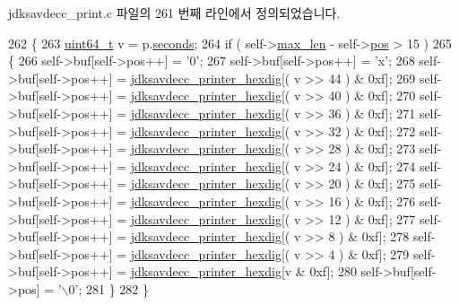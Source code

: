 jdksavdecc\+\_\+print.\+c 파일의 261 번째 라인에서 정의되었습니다.


\begin{DoxyCode}
262 \{
263     \hyperlink{parse_8c_aec6fcb673ff035718c238c8c9d544c47}{uint64\_t} v = p.\hyperlink{structjdksavdecc__gptp__seconds_aae1213f8226839b7226bcbfb6f1e568d}{seconds};
264     \textcolor{keywordflow}{if} ( self->\hyperlink{structjdksavdecc__printer_a956cb5a3c4322e6d67c2f2b21077716c}{max\_len} - self->\hyperlink{structjdksavdecc__printer_a5438a597ee291f523ae04a9fe355924f}{pos} > 15 )
265     \{
266         \textcolor{keyword}{self}->buf[\textcolor{keyword}{self}->pos++] = \textcolor{charliteral}{'0'};
267         \textcolor{keyword}{self}->buf[\textcolor{keyword}{self}->pos++] = \textcolor{charliteral}{'x'};
268         \textcolor{keyword}{self}->buf[\textcolor{keyword}{self}->pos++] = \hyperlink{jdksavdecc__print_8c_ad23c15dfac839a83ff16748e1737ba80}{jdksavdecc\_printer\_hexdig}[( v >> 44 ) & 0xf];
269         \textcolor{keyword}{self}->buf[\textcolor{keyword}{self}->pos++] = \hyperlink{jdksavdecc__print_8c_ad23c15dfac839a83ff16748e1737ba80}{jdksavdecc\_printer\_hexdig}[( v >> 40 ) & 0xf];
270         \textcolor{keyword}{self}->buf[\textcolor{keyword}{self}->pos++] = \hyperlink{jdksavdecc__print_8c_ad23c15dfac839a83ff16748e1737ba80}{jdksavdecc\_printer\_hexdig}[( v >> 36 ) & 0xf];
271         \textcolor{keyword}{self}->buf[\textcolor{keyword}{self}->pos++] = \hyperlink{jdksavdecc__print_8c_ad23c15dfac839a83ff16748e1737ba80}{jdksavdecc\_printer\_hexdig}[( v >> 32 ) & 0xf];
272         \textcolor{keyword}{self}->buf[\textcolor{keyword}{self}->pos++] = \hyperlink{jdksavdecc__print_8c_ad23c15dfac839a83ff16748e1737ba80}{jdksavdecc\_printer\_hexdig}[( v >> 28 ) & 0xf];
273         \textcolor{keyword}{self}->buf[\textcolor{keyword}{self}->pos++] = \hyperlink{jdksavdecc__print_8c_ad23c15dfac839a83ff16748e1737ba80}{jdksavdecc\_printer\_hexdig}[( v >> 24 ) & 0xf];
274         \textcolor{keyword}{self}->buf[\textcolor{keyword}{self}->pos++] = \hyperlink{jdksavdecc__print_8c_ad23c15dfac839a83ff16748e1737ba80}{jdksavdecc\_printer\_hexdig}[( v >> 20 ) & 0xf];
275         \textcolor{keyword}{self}->buf[\textcolor{keyword}{self}->pos++] = \hyperlink{jdksavdecc__print_8c_ad23c15dfac839a83ff16748e1737ba80}{jdksavdecc\_printer\_hexdig}[( v >> 16 ) & 0xf];
276         \textcolor{keyword}{self}->buf[\textcolor{keyword}{self}->pos++] = \hyperlink{jdksavdecc__print_8c_ad23c15dfac839a83ff16748e1737ba80}{jdksavdecc\_printer\_hexdig}[( v >> 12 ) & 0xf];
277         \textcolor{keyword}{self}->buf[\textcolor{keyword}{self}->pos++] = \hyperlink{jdksavdecc__print_8c_ad23c15dfac839a83ff16748e1737ba80}{jdksavdecc\_printer\_hexdig}[( v >> 8 ) & 0xf];
278         \textcolor{keyword}{self}->buf[\textcolor{keyword}{self}->pos++] = \hyperlink{jdksavdecc__print_8c_ad23c15dfac839a83ff16748e1737ba80}{jdksavdecc\_printer\_hexdig}[( v >> 4 ) & 0xf];
279         \textcolor{keyword}{self}->buf[\textcolor{keyword}{self}->pos++] = \hyperlink{jdksavdecc__print_8c_ad23c15dfac839a83ff16748e1737ba80}{jdksavdecc\_printer\_hexdig}[v & 0xf];
280         \textcolor{keyword}{self}->buf[\textcolor{keyword}{self}->pos] = \textcolor{charliteral}{'\(\backslash\)0'};
281     \}
282 \}
\end{DoxyCode}


